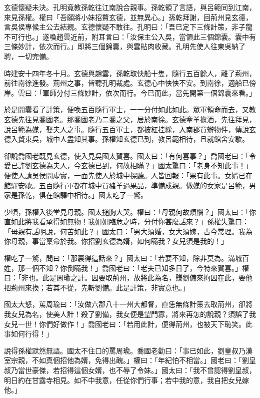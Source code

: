 玄德懷疑未決。孔明竟教孫乾往江南說合親事。孫乾領了言語，與呂範同到江南，來見孫權。權曰「吾願將小妹招贅玄德，並無異心。」孫乾拜謝，回荊州見玄德，言吳侯專候主公去結親。玄德懷疑不敢往。孔明曰：「吾已定下三條計策，非子龍不可行也。」遂喚趙雲近前，附耳言曰：「汝保主公入吳，當領此三個錦囊。囊中有三條妙計，依次而行。」即將三個錦囊，與雲貼肉收藏。孔明先使人往東吳納了聘，一切完備。

時建安十四年冬十月。玄德與趙雲，孫乾取快船十隻，隨行五百餘人，離了荊州，前往南徐進發。荊州之事，皆聽孔明裁處。玄德心中怏怏不安。到南徐，適船已傍岸。雲曰：「軍師分付三條妙計，依次而行。今已而此，當先開第一個錦囊來看。」

於是開囊看了計策，便喚五百隨行軍士，一一分付如此如此。眾軍領命而去，又教玄德先往見喬國老。那喬國老乃二喬之父，居於南徐。玄德牽羊擔酒，先往拜見，說呂範為媒，娶夫人之事。隨行五百軍士，都披紅挂綵，入南郡買辦物件，傳說玄德入贅東吳，城中人盡知其事。孫權知玄德已到，教呂範相待，且就館舍安歇。

卻說喬國老既見玄德，使入見吳國太賀喜。國太曰：「有何喜事？」喬國老曰：「令愛已許劉玄德為夫人，今玄德已到，何故相瞞？」國太驚曰：「老身不知此事！」便使人請吳侯問虛實，一面先使人於城中探聽。人皆回報：「果有此事。女婿已在館驛安歇。五百隨行軍都在城中買豬羊過果品，準備成親。做媒的女家是呂範，男家是孫乾，俱在館驛中相待。」國太吃了一驚。

少頃，孫權入後堂見母親。國太搥胸大哭。權曰：「母親何故煩惱？」國太曰：「你直如此將我看承得如無物！我姐姐臨危之時，分付你甚麼話來？」孫權失驚曰：「母親有話明說，何苦如此？」國太曰：「男大須婚，女大須嫁，古今常理。我為你母親，事當稟命於我。你招劉玄德為婿，如何瞞我？女兒須是我的！」

權吃了一驚，問曰：「那裏得這話來？」國太曰：「若要不知，除非莫為。滿城百姓，那一個不知？你倒瞞我！」喬國老曰：「老夫已知多日了，今特來賀喜。」權曰：「非也。此是周瑜之計。因要取荊州，故將此為名，賺劉備來拘囚在此，要他把荊州來換；若其不從，先斬劉備。此是計策，非實意也。」

國太大怒，罵周瑜曰：「汝做六郡八十一州大都督，直恁無條計策去取荊州，卻將我女兒為名，使美人計！殺了劉備，我女便是望門寡，將來再怎的說親？須誤了我女兒一世！你們好做作！」喬國老曰：「若用此計，便得荊州，也被天下恥笑。此事如何行得！」

說得孫權默然無語。國太不住口的罵周瑜。喬國老勸曰：「事已如此，劉皇叔乃漢室宗親，不如真個招他為婿，免得出醜。」權曰：「年紀怕不相當。」國老曰：「劉皇叔乃當世豪傑，若招得這個女婿，也不辱了令妹。」國太曰：「我不曾認得劉皇叔，明日約在甘露寺相見。如不中我意，任從你們行事；若中我的意，我自把女兒嫁他。」

